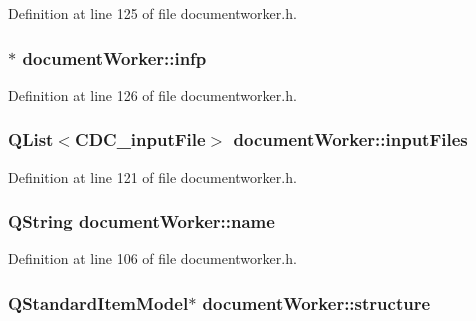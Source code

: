 Definition at line 125 of file documentworker.\+h.

\hypertarget{classdocument_worker_a0568a560290f197dcb16ebdb15593e3b}{
\subsubsection[{infp}]{$\ast$ document\+Worker\+::infp\hspace{0.3cm}{\ttfamily [private]}}}\label{classdocument_worker_a0568a560290f197dcb16ebdb15593e3b}


Definition at line 126 of file documentworker.\+h.

\hypertarget{classdocument_worker_a5812c9d02689c044852beb5904c24e82}{
\subsubsection[{input\+Files}]{\setlength{\rightskip}{0pt plus 5cm}Q\+List$<${\bf C\+D\+C\+\_\+input\+File}$>$ document\+Worker\+::input\+Files\hspace{0.3cm}{\ttfamily [private]}}}\label{classdocument_worker_a5812c9d02689c044852beb5904c24e82}


Definition at line 121 of file documentworker.\+h.

\hypertarget{classdocument_worker_af67a64425e1e24d88333afda12eb4d1d}{
\subsubsection[{name}]{\setlength{\rightskip}{0pt plus 5cm}Q\+String document\+Worker\+::name\hspace{0.3cm}{\ttfamily [private]}}}\label{classdocument_worker_af67a64425e1e24d88333afda12eb4d1d}


Definition at line 106 of file documentworker.\+h.

\hypertarget{classdocument_worker_af05a07271fc523897d0154400f6dddb0}{
\subsubsection[{structure}]{\setlength{\rightskip}{0pt plus 5cm}Q\+Standard\+Item\+Model$\ast$ document\+Worker\+::structure\hspace{0.3cm}{\ttfamily [private]}}}\label{classdocument_worker_af05a07271fc523897d0154400f6dddb0}


